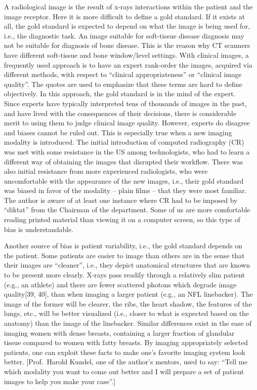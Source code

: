 \documentclass[
]{book}
\begin{document}
A radiological image is the result of x-rays interactions within the patient and the image receptor. Here it is more difficult to define a gold standard. If it exists at all, the gold standard is expected to depend on what the image is being used for, i.e., the diagnostic task. An image suitable for soft-tissue disease diagnosis may not be suitable for diagnosis of bone disease. This is the reason why CT scanners have different soft-tissue and bone window/level settings. With clinical images, a frequently used approach is to have an expert rank-order the images, acquired via different methods, with respect to ``clinical appropriateness'' or ``clinical image quality''. The quotes are used to emphasize that these terms are hard to define objectively. In this approach, the gold standard is in the mind of the expert. Since experts have typically interpreted tens of thousands of images in the past, and have lived with the consequences of their decisions, there is considerable merit to using them to judge clinical image quality. However, experts do disagree and biases cannot be ruled out. This is especially true when a new imaging modality is introduced. The initial introduction of computed radiography (CR) was met with some resistance in the US among technologists, who had to learn a different way of obtaining the images that disrupted their workflow. There was also initial resistance from more experienced radiologists, who were uncomfortable with the appearance of the new images, i.e., their gold standard was biased in favor of the modality -- plain films -- that they were most familiar. The author is aware of at least one instance where CR had to be imposed by ``diktat'' from the Chairman of the department. Some of us are more comfortable reading printed material than viewing it on a computer screen, so this type of bias is understandable.

Another source of bias is patient variability, i.e., the gold standard depends on the patient. Some patients are easier to image than others are in the sense that their images are ``cleaner'', i.e., they depict anatomical structures that are known to be present more clearly. X-rays pass readily through a relatively slim patient (e.g., an athlete) and there are fewer scattered photons which degrade image quality{[}39, 40{]}, than when imaging a larger patient (e.g., an NFL linebacker). The image of the former will be clearer, the ribs, the heart shadow, the features of the lungs, etc., will be better visualized (i.e., closer to what is expected based on the anatomy) than the image of the linebacker. Similar differences exist in the ease of imaging women with dense breasts, containing a larger fraction of glandular tissue compared to women with fatty breasts. By imaging appropriately selected patients, one can exploit these facts to make one's favorite imaging system look better. {[}Prof.~Harold Kundel, one of the author's mentors, used to say: ``Tell me which modality you want to come out better and I will prepare a set of patient images to help you make your case''.{]}
\end{document}
